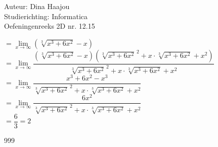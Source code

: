 \documentclass[a4paper]{article}
\begin{document}
\noindent \large Auteur: Dina Haajou \\
\noindent \large Studierichting: Informatica \\
\noindent \large Oefeningenreeks 2D nr. 12.15 \\

\medskip

\normalsize

$= \lim\limits_{x \to \infty} \left( \sqrt[3]{x^3 + 6x^2} - x \right)$ \\

$= \lim\limits_{x \to \infty} \dfrac{ \left( \sqrt[3]{x^3 + 6x^2} - x \right) \left( \sqrt[3]{x^3 + 6x^2}^{\,2} + x \cdot \sqrt[3]{x^3 + 6x^2} + x^2 \right)}{ \sqrt[3]{x^3 + 6x^2}^{\,2} + x \cdot \sqrt[3]{x^3 + 6x^2} + x^2 }$ \\

$= \lim\limits_{x \to \infty} \dfrac{ x^3 + 6x^2 - x^3 }{ \sqrt[3]{x^3 + 6x^2}^{\,2} + x \cdot \sqrt[3]{x^3 + 6x^2} + x^2 }$ \\

$= \lim\limits_{x \to \infty} \dfrac{ 6x^2 }{ \sqrt[3]{x^3 + 6x^2}^{\,2} + x \cdot \sqrt[3]{x^3 + 6x^2} + x^2 }$ \\

$= \dfrac{6}{3} = 2$

\begin{thebibliography}{999}
\end{thebibliography}
\end{document}
